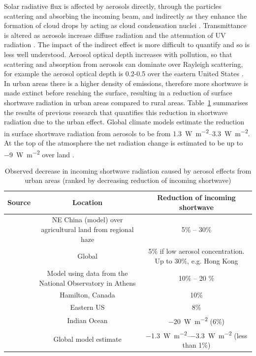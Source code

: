 \documentclass[a4paper,titlepage, twoside]{report}
\begin{document}
Solar radiative flux is affected by aerosols directly, through the particles scattering and absorbing the incoming beam, and indirectly as they enhance the formation of cloud drops by acting as cloud condensation nuclei \parencite{chameides}.  Transmittance is altered as aerosols increase diffuse radiation and the attenuation of UV radiation \parencite{cleugh}.  The impact of the indirect effect is more difficult to quantify and so is less well understood. Aerosol optical depth increases with pollution, so that scattering and absorption from aerosols can dominate over Rayleigh scattering, for example the aerosol optical depth is 0.2-0.5 over the eastern United States \parencite{chameides}.  In urban areas there is a higher density of emissions, therefore more shortwave is made extinct before reaching the surface, resulting in a reduction of surface shortwave radiation in urban areas compared to rural areas.  Table~\ref{tab:aerosol-sw} summarises the results of previous research that quantifies this reduction in shortwave radiation due to the urban effect. Global climate models estimate the reduction in surface shortwave radiation from aerosols to be from \SIrange{1.3}{3.3}{\watt\per\meter\squared}.  At the top of the atmosphere the net radiation change is estimated to be up to \SI{-9}{\watt\per\meter\squared} over land \parencite{ipcc}.

\begin{table}
\centering
\begin{tabular}{ c c c }
\toprule
Source &	Location &	Reduction of incoming shortwave \\ \midrule
\cite{chameides} &	NE China (model) over agricultural land from regional haze & 5\% -- 30\% \\
\cite{cleugh} & 	Global &	5\% if low aerosol concentration.  Up to 30\%, e.g. Hong Kong \\
\cite{psiloglou} &	Model using data from the National Observatory in Athens & 10\% -- 20 \% \\
\cite{rouse} &		Hamilton, Canada & 10\% \\
\cite{ball} &		Eastern US & 8\% \\
\cite{ramanathan} &	Indian Ocean & \SI{-20}{\watt\per\meter\squared} (6\%) \\
\cite{ipcc} &		Global model estimate & \SIrange{-1.3}{-3.3}{\watt\per\meter\squared} (less than 1\%) \\ \bottomrule
\end{tabular}
\caption{Observed decrease in incoming shortwave radiation caused by aerosol effects from urban areas (ranked by decreasing reduction of incoming shortwave)}
\label{tab:aerosol-sw}
\end{table}
\end{document}
